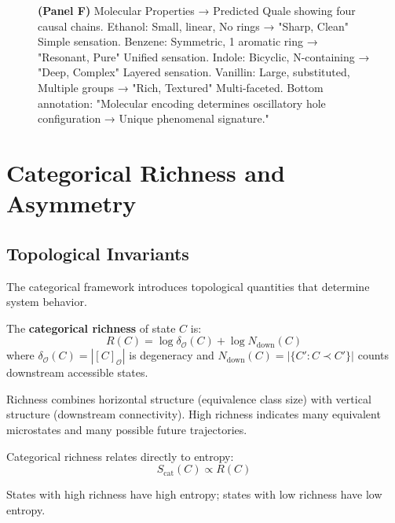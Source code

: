 \begin{figure}[htbp]
{    \textbf{(Panel F)} Molecular Properties → Predicted Quale showing four causal chains. Ethanol: Small, linear, No rings → "Sharp, Clean" Simple sensation. Benzene: Symmetric, 1 aromatic ring → "Resonant, Pure" Unified sensation. Indole: Bicyclic, N-containing → "Deep, Complex" Layered sensation. Vanillin: Large, substituted, Multiple groups → "Rich, Textured" Multi-faceted. Bottom annotation: "Molecular encoding determines oscillatory hole configuration → Unique phenomenal signature."
    }
    \label{fig:molecular_encodings}
    \end{figure}

\section{Categorical Richness and Asymmetry}

\subsection{Topological Invariants}

The categorical framework introduces topological quantities that determine system behavior.

\begin{definition}
\label{def:richness}
The \textbf{categorical richness} of state $C$ is:
\begin{equation}
R(C) = \log \delta_{\mathcal{O}}(C) + \log N_{\text{down}}(C)
\end{equation}
where $\delta_{\mathcal{O}}(C) = |[C]_{\mathcal{O}}|$ is degeneracy and $N_{\text{down}}(C) = |\{C' : C \prec C'\}|$ counts downstream accessible states.
\end{definition}

Richness combines horizontal structure (equivalence class size) with vertical structure (downstream connectivity). High richness indicates many equivalent microstates and many possible future trajectories.

\begin{proposition}
\label{prop:richness_entropy}
Categorical richness relates directly to entropy:
\begin{equation}
S_{\text{cat}}(C) \propto R(C)
\end{equation}

States with high richness have high entropy; states with low richness have low entropy.
\end{proposition}

